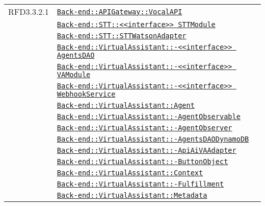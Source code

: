 \begin{longtable}{|>{\centering}m{3cm}|m{10cm}<{\centering}|}
RFD3.3.2.1 & \hyperref[Back-end::APIGateway::VocalAPI]{\texttt{Back-end::APIGateway::VocalAPI}}\\
& \hyperref[Back-end::STT::<<interface>> STTModule]{\texttt{Back-end::STT::<<interface>> STTModule}}\\
& \hyperref[Back-end::STT::STTWatsonAdapter]{\texttt{Back-end::STT::STTWatsonAdapter}}\\
& \hyperref[Back-end::VirtualAssistant::<<interface>> AgentsDAO]{\texttt{Back-end::VirtualAssistant::-\linebreak <<interface>> AgentsDAO}}\\
& \hyperref[Back-end::VirtualAssistant::<<interface>> VAModule]{\texttt{Back-end::VirtualAssistant::-\linebreak <<interface>> VAModule}}\\
& \hyperref[Back-end::VirtualAssistant::<<interface>> WebhookService]{\texttt{Back-end::VirtualAssistant::-\linebreak <<interface>> WebhookService}}\\
& \hyperref[Back-end::VirtualAssistant::Agent]{\texttt{Back-end::VirtualAssistant::Agent}}\\
& \hyperref[Back-end::VirtualAssistant::AgentObservable]{\texttt{Back-end::VirtualAssistant::-\linebreak AgentObservable}}\\
& \hyperref[Back-end::VirtualAssistant::AgentObserver]{\texttt{Back-end::VirtualAssistant::-\linebreak AgentObserver}}\\
& \hyperref[Back-end::VirtualAssistant::AgentsDAODynamoDB]{\texttt{Back-end::VirtualAssistant::-\linebreak AgentsDAODynamoDB}}\\
& \hyperref[Back-end::VirtualAssistant::ApiAiVAAdapter]{\texttt{Back-end::VirtualAssistant::-\linebreak ApiAiVAAdapter}}\\
& \hyperref[Back-end::VirtualAssistant::ButtonObject]{\texttt{Back-end::VirtualAssistant::-\linebreak ButtonObject}}\\
& \hyperref[Back-end::VirtualAssistant::Context]{\texttt{Back-end::VirtualAssistant::Context}}\\
& \hyperref[Back-end::VirtualAssistant::Fulfillment]{\texttt{Back-end::VirtualAssistant::-\linebreak Fulfillment}}\\
& \hyperref[Back-end::VirtualAssistant::Metadata]{\texttt{Back-end::VirtualAssistant::Metadata}}\\

\end{longtable}
